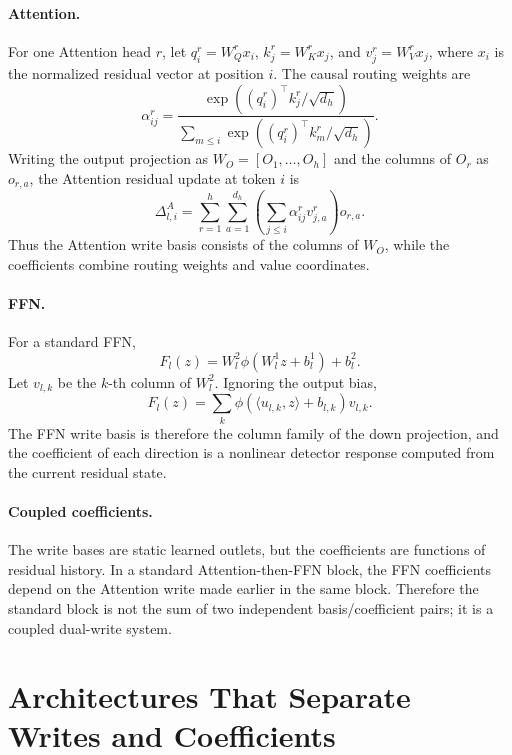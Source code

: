 \documentclass[letterpaper]{article}
\begin{document}
\paragraph{Attention.}
For one Attention head $r$, let
$q_i^r=W_Q^r x_i$, $k_j^r=W_K^r x_j$, and $v_j^r=W_V^r x_j$, where
$x_i$ is the normalized residual vector at position $i$. The causal routing
weights are
\begin{equation}
\alpha_{ij}^r =
\frac{\exp((q_i^r)^\top k_j^r/\sqrt{d_h})}
{\sum_{m\leq i}\exp((q_i^r)^\top k_m^r/\sqrt{d_h})}.
\end{equation}
Writing the output projection as $W_O=[O_1,\ldots,O_h]$ and the columns of
$O_r$ as $o_{r,a}$, the Attention residual update at token $i$ is
\begin{equation}
\Delta_{l,i}^{A}
=\sum_{r=1}^{h}\sum_{a=1}^{d_h}
\left(\sum_{j\leq i}\alpha_{ij}^r v_{j,a}^r\right)o_{r,a}.
\label{eq:attn-basis}
\end{equation}
Thus the Attention write basis consists of the columns of $W_O$, while the
coefficients combine routing weights and value coordinates.

\paragraph{FFN.}
For a standard FFN,
\begin{equation}
F_l(z)=W_l^2\phi(W_l^1z+b_l^1)+b_l^2.
\end{equation}
Let $v_{l,k}$ be the $k$-th column of $W_l^2$. Ignoring the output bias,
\begin{equation}
F_l(z)=\sum_k
\phi(\langle u_{l,k},z\rangle+b_{l,k})v_{l,k}.
\label{eq:ffn-basis}
\end{equation}
The FFN write basis is therefore the column family of the down projection, and
the coefficient of each direction is a nonlinear detector response computed
from the current residual state.

\paragraph{Coupled coefficients.}
The write bases are static learned outlets, but the coefficients are functions
of residual history. In a standard Attention-then-FFN block, the FFN
coefficients depend on the Attention write made earlier in the same block.
Therefore the standard block is not the sum of two independent
basis/coefficient pairs; it is a coupled dual-write system.

\section{Architectures That Separate Writes and Coefficients}
\end{document}
